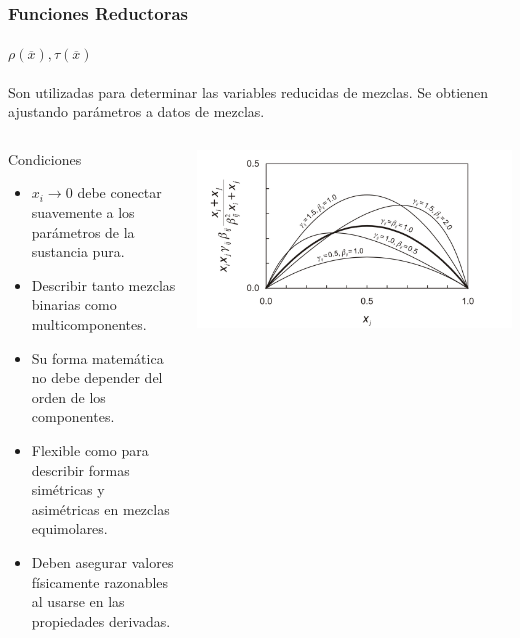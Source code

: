 \documentclass[aspectratio=1610,multi,rgb]{beamer}
\begin{document}
\begin{frame}
	\frametitle{Funciones Reductoras}
	\framesubtitle{$\rho(\overline{x}), \tau(\overline{x})$}
	Son utilizadas para determinar las variables reducidas de mezclas.
	Se obtienen ajustando parámetros a datos de mezclas.
	\begin{columns}
	\small{
	\begin{block}{Condiciones}
		\begin{itemize}
		\item $x_i {\rightarrow 0}$ debe conectar suavemente
		a los parámetros de la sustancia pura.
		\item Describir tanto mezclas binarias como 
		multicomponentes.
		\item Su forma matemática no debe depender del orden
		de los componentes.
		\item Flexible como para describir formas simétricas
		y asimétricas  en mezclas equimolares.
		\item Deben asegurar valores físicamente razonables
		al usarse en las propiedades derivadas.
		\end{itemize}
	\end{block}
	}
		\includegraphics[width=\textwidth]{figs/equimolar_mix.png}
	\end{columns}
\end{frame}
\end{document}
